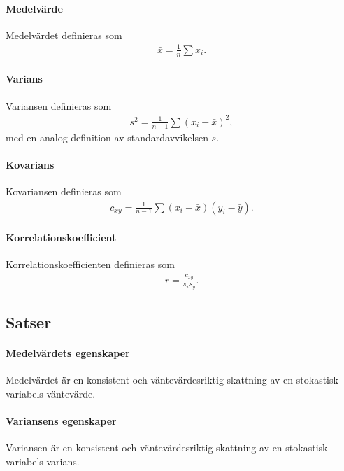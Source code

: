 \paragraph{Medelvärde}
Medelvärdet definieras som
\begin{align*}
	\bar{x} = \frac{1}{n}\sum x_i.
\end{align*}

\paragraph{Varians}
Variansen definieras som
\begin{align*}
	s^2 = \frac{1}{n - 1}\sum (x_i - \bar{x})^2,
\end{align*}
med en analog definition av standardavvikelsen $s$.

\paragraph{Kovarians}
Kovariansen definieras som
\begin{align*}
	c_{xy} = \frac{1}{n - 1}\sum (x_i - \bar{x})(y_i - \bar{y}).
\end{align*}

\paragraph{Korrelationskoefficient}
Korrelationskoefficienten definieras som
\begin{align*}
	r = \frac{c_{xy}}{s_{x}s_{y}}.
\end{align*}

\subsection{Satser}

\paragraph{Medelvärdets egenskaper}
Medelvärdet är en konsistent och väntevärdesriktig skattning av en stokastisk variabels väntevärde.

\paragraph{Variansens egenskaper}
Variansen är en konsistent och väntevärdesriktig skattning av en stokastisk variabels varians.